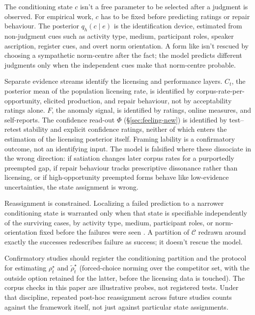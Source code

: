 The conditioning state $c$ isn't a free parameter to be selected after a judgment is observed. For empirical work, $c$ has to be fixed before predicting ratings or repair behaviour. The posterior $q_h(c\mid e)$ is the identification device, estimated from non-judgment cues such as activity type, medium, participant roles, speaker ascription, register cues, and overt norm orientation. A form like  isn't rescued by choosing a sympathetic norm-centre after the fact; the model predicts different judgments only when the independent cues make that norm-centre probable.

Separate evidence streams identify the licensing and performance layers. $C_t$, the posterior mean of
the population licensing rate, is identified by corpus-rate-per-opportunity,
elicited production, and repair behaviour, not by acceptability ratings alone.
$F$, the anomaly signal, is identified by ratings, online measures, and
self-reports. The confidence read-out $\Phi$ (\S\ref{sec:feeling-new}) is
identified by test--retest stability and explicit confidence ratings, neither of
which enters the estimation of the licensing posterior itself. Framing lability
is a confirmatory outcome, not an identifying input. The model is falsified
where these dissociate in the wrong direction: if satiation changes later corpus
rates for a purportedly preempted gap, if repair behaviour tracks prescriptive
dissonance rather than licensing, or if high-opportunity preempted forms behave
like low-evidence uncertainties, the state assignment is wrong.

Reassignment is constrained. Localizing a failed prediction to a narrower
conditioning state is warranted only when that state is specifiable independently
of the surviving cases, by activity type, medium, participant roles, or
norm-orientation fixed before the failures were seen
\autocite{reynolds2026kindsProjectibilityProfiles}. A partition of
$\mathcal{C}$ redrawn around exactly the successes redescribes failure as
success; it doesn't rescue the model.

Confirmatory studies should register the conditioning partition and the protocol
for estimating $\rho_t^\star$ and $\widetilde{\rho}_t^\star$ (\eg forced-choice
norming over the competitor set, with the outside option retained for the latter,
before the licensing data is touched). The corpus checks in this paper are
illustrative probes, not registered tests. Under that discipline, repeated
post-hoc reassignment across future studies counts against the framework itself,
not just against particular state assignments.

